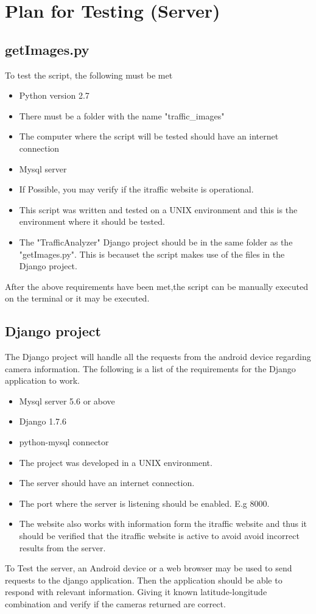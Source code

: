 \documentclass{article}
\begin{document}
\section{Plan for Testing (Server)}
\subsection{getImages.py}
To test the script, the following must be met
\begin{itemize}
\item Python version 2.7
\item There must be a folder with the name "traffic\_images"
\item The computer where the script will be tested should have an internet connection
\item Mysql server
\item If Possible, you may verify if the itraffic website is operational.
\item This script was written and tested on a UNIX environment and this is the environment where it should be tested.
\item The "TrafficAnalyzer" Django project should be in the same folder as the "getImages.py". This is becauset the script makes use of the files in the Django project.
\end{itemize}

After the above requirements have been met,the script can be manually executed on the terminal or it may be executed.

\subsection{Django project}
The Django project will handle all the requests from the android device regarding camera information. The following is a list of the requirements for the Django application to work.
\begin{itemize}
\item Mysql server 5.6 or above
\item Django 1.7.6
\item python-mysql connector
\item The project was developed in a UNIX environment.
\item The server should have an internet connection.
\item The port where the server is listening should be enabled. E.g 8000.
\item The website also works with information form the itraffic website and thus it should be verified that the itraffic website is active to avoid avoid incorrect results from the server.
\end{itemize}
To Test the server, an Android device or a web browser may be used to send requests to the django application. Then the application should be able to respond with relevant information. Giving it known latitude-longitude combination and verify if the cameras returned are correct.
\end{document}
